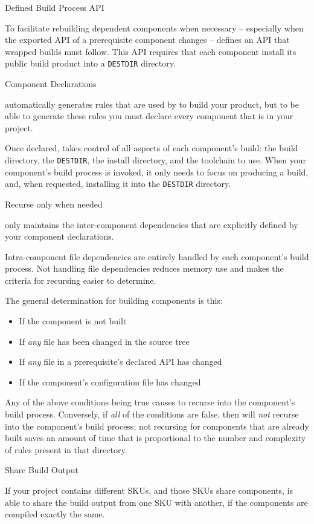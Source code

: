 \begin{description}
\item Defined Build Process API

  To facilitate rebuilding dependent components when necessary --
  especially when the exported API of a prerequisite component changes
  -- \lmsbw defines an API that wrapped builds must follow.  This API
  requires that each component install its public build product into a
  \texttt{DESTDIR} directory.

\item Component Declarations

  \lmsbw automatically generates rules that are used by \make to build
  your product, but to be able to generate these rules you must
  declare every component that is in your project.

  Once declared, \lmsbw takes control of all aspects of each
  component's build: the build directory, the \texttt{DESTDIR}, the
  install directory, and the toolchain to use.  When your component's
  build process is invoked, it only needs to focus on producing a
  build, and, when requested, installing it into the \texttt{DESTDIR}
  directory.

\item Recurse only when needed

  \lmsbw only maintains the inter-component dependencies that are
  explicitly defined by your component declarations.

  Intra-component file dependencies are entirely handled by each
  component's build process.  Not handling file dependencies reduces
  memory use and makes the criteria for recursing easier to determine.

  The general determination for building components is this:

  \begin{itemize}
  \item If the component is not built
  \item If \emph{any} file has been changed in the source tree
  \item If \emph{any} file in a prerequisite's declared API has
    changed
  \item If the component's configuration file has changed
  \end{itemize}

  Any of the above conditions being true causes \lmsbw to recurse into
  the component's build process.  Conversely, if \emph{all} of the
  conditions are false, then \lmsbw will \emph{not} recurse into the
  component's build process; not recursing for components that are
  already built saves an amount of time that is proportional to the
  number and complexity of \make rules present in that directory.

\item Share Build Output

  If your project contains different SKUs, and those SKUs share
  components, \lmsbw is able to share the build output from one SKU
  with another, if the components are compiled exactly the same.

\end{description}

